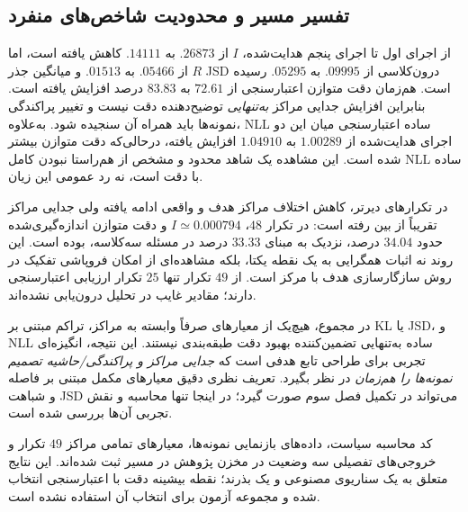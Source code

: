 \subsection{تفسیر مسیر و محدودیت شاخص‌های منفرد}
\label{subsec:ch4-center-observation-interpretation}
از اجرای اول تا اجرای پنجم هدایت‌شده، $I$ از $.26873$ به $.14111$ کاهش یافته است، اما $R$ از $.05466$ به $.01513$ و میانگین جذر JSD درون‌کلاسی از $.09995$ به $.05295$ رسیده است. هم‌زمان دقت متوازن اعتبارسنجی از $72.61$ به $83.83$ درصد افزایش یافته است. بنابراین افزایش جدایی مراکز \emph{به‌تنهایی} توضیح‌دهنده دقت نیست و تغییر پراکندگی نمونه‌ها باید همراه آن سنجیده شود. به‌علاوه، NLL ساده اعتبارسنجی میان این دو اجرای هدایت‌شده از $1.00289$ به $1.04910$ افزایش یافته، درحالی‌که دقت متوازن بیشتر شده است. این مشاهده یک شاهد محدود و مشخص از هم‌راستا نبودن کامل NLL ساده با دقت است، نه رد عمومی این زیان.

در تکرارهای دیرتر، کاهش اختلاف مراکز هدف و واقعی ادامه یافته ولی جدایی مراکز تقریباً از بین رفته است: در تکرار $48$، $I\simeq0.000794$ و دقت متوازن اندازه‌گیری‌شده حدود $34.04$ درصد، نزدیک به مبنای $33.33$ درصد در مسئله سه‌کلاسه، بوده است. این روند نه اثبات همگرایی به یک نقطه یکتا، بلکه مشاهده‌ای از امکان فروپاشی تفکیک در روش سازگارسازی هدف با مرکز است. از $49$ تکرار تنها $25$ تکرار ارزیابی اعتبارسنجی دارند؛ مقادیر غایب در تحلیل درون‌یابی نشده‌اند.

در مجموع، هیچ‌یک از معیارهای صرفاً وابسته به مراکز، تراکم مبتنی بر KL یا JSD، و NLL ساده به‌تنهایی تضمین‌کننده بهبود دقت طبقه‌بندی نیستند. این نتیجه، انگیزه‌ای تجربی برای طراحی تابع هدفی است که \emph{جدایی مراکز و پراکندگی/حاشیه تصمیم نمونه‌ها را هم‌زمان} در نظر بگیرد. تعریف نظری دقیق معیارهای مکمل مبتنی بر فاصله و شباهت JSD می‌تواند در تکمیل فصل سوم صورت گیرد؛ در اینجا تنها محاسبه و نقش تجربی آن‌ها بررسی شده است.

کد محاسبه سیاست، داده‌های بازنمایی نمونه‌ها، معیارهای تمامی مراکز $49$ تکرار و خروجی‌های تفصیلی سه وضعیت در مخزن پژوهش در مسیر  ثبت شده‌اند. این نتایج متعلق به یک سناریوی مصنوعی و یک بذرند؛ نقطه بیشینه دقت با اعتبارسنجی انتخاب شده و مجموعه آزمون برای انتخاب آن استفاده نشده است.
